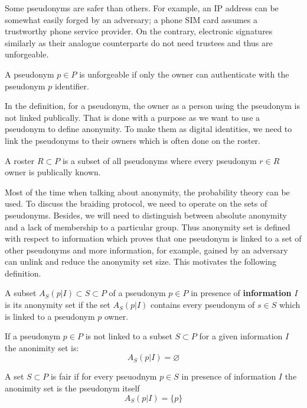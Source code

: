 \documentclass[12pt]{article}
\newenvironment{corollary}[2][Corollary]{\begin{trivlist}
\item[\hskip \labelsep {\bfseries #1}\hskip \labelsep {\bfseries #2.}]}{\end{trivlist}}
\newenvironment{definition}[2][Definition]{\begin{trivlist}
\item[\hskip \labelsep {\bfseries #1}\hskip \labelsep {\bfseries #2.}]}{\end{trivlist}}
\begin{document}
Some pseudonyms are safer than others. For example, an IP address can be somewhat easily forged by an adversary; a phone SIM card assumes a trustworthy phone service provider. On the contrary, electronic signatures similarly as their analogue counterparts do not need trustees and thus are unforgeable. 
\begin{definition}{(unforgeability)}
  A pseudonym $p \in P$ is unforgeable if only the owner can authenticate with the pseudonym $p$ identifier.
\end{definition}

In the definition, for a pseudonym, the owner as a person using the pseudonym is not linked publically. That is done with a purpose as we want to use a pseudonym to define anonymity. To make them as digital identities, we need to link the pseudonyms to their owners which is often done on the roster. 
\begin{definition}{(roster)}
  A roster $R \subset P$ is a subset of all pseudonyms where every pseudonym $r \in R$ owner is publically known.
\end{definition}

Most of the time when talking about anonymity, the probability theory can be used. To discuss the braiding protocol, we need to operate on the sets of pseudonyms. Besides, we will need to distinguish between absolute anonymity and a lack of membership to a particular group. Thus anonymity set is defined with respect to information which proves that one pseudonym is linked to a set of other pseudonyms and more information, for example, gained by an adversary can unlink and reduce the anonymity set size. This motivates the following definition.
\begin{definition}{(anonymity set)}
  A subset $A_S(p | I) \subset S \subset P$ of a pseudonym $p \in P$ in presence of {\bf information} $I$ is its anonymity set if the set $A_S(p | I)$ contains every pseudonym of $s \in S$ which is linked to a pseudonym $p$ owner.
\end{definition}


\begin{corollary}{I}
  If a pseudonym $p \in P$ is not linked to a subset $S \subset P$ for a given information $I$ the anonimity set is:
  \begin{equation}
    A_S(p | I) = \varnothing
  \end{equation}
\end{corollary}

\begin{definition}{(fairness)}
  A set $S \subset P$ is fair if for every pseuodnym $p \in S$ in presence of information $I$ the anonimity set is the pseudonym itself
  \begin{equation}
    A_S(p | I) = \{p\}
  \end{equation}
\end{definition}
\end{document}
